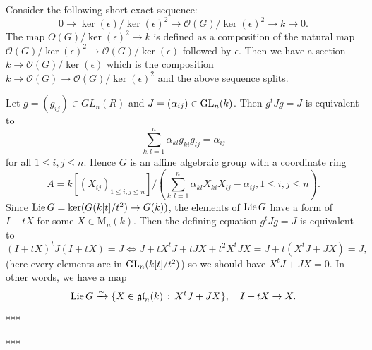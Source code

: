 \begin{problem}
Consider the following short exact sequence:
$$
    0 \to \ker(\epsilon) / \ker(\epsilon)^{2} \to \mathcal{O}(G) / \ker(\epsilon)^{2} \to k \to 0.
$$
The map $O(G) / \ker(\epsilon)^{2} \to k$ is defined as a composition of the natural map $\mathcal{O}(G)/\ker(\epsilon)^{2} \to \mathcal{O}(G)/\ker(\epsilon)$
followed by $\epsilon$.
Then we have a section $k \to \mathcal{O}(G)/\ker(\epsilon)$ which is the composition $k \to \mathcal{O}(G) \to \mathcal{O}(G)/\ker(\epsilon)^{2}$ and the above sequence splits.
\end{problem}

\begin{problem}
Let $g = (g_{ij}) \in GL_{n}(R)$ and $J = (\alpha_{ij}) \in \operatorname{\mathrm{GL}}_{n}(k)$.
Then $g^{t}Jg = J$ is equivalent to
$$
    \sum_{k, l = 1}^{n} \alpha_{kl}g_{ki}g_{lj} = \alpha_{ij}
$$
for all $1\leq i, j \leq n$.
Hence $G$ is an affine algebraic group with a coordinate ring
$$
A = k[(X_{ij})_{1\leq i, j \leq n}]/\left(\sum_{k, l =1}^{n} \alpha_{kl}X_{ki}X_{lj} - \alpha_{ij}, 1\leq i, j \leq n\right).
$$
Since $\operatorname{\mathrm{Lie}} G = \ker(G(k[t]/t^{2}) \to G(k))$, the elements of $\operatorname{\mathrm{Lie}} G$ have a form of $I + tX$ for some $X\in \mathrm{M}_{n}(k)$.
Then the defining equation $g^{t}Jg = J$ is equivalent to
$$
    (I + tX)^{t}J(I + tX) = J \Leftrightarrow J + tX^{t}J + tJX + t^{2}X^{t}JX = J + t(X^{t}J + JX) = J,
$$
(here every elements are in $\operatorname{\mathrm{GL}}_{n}(k[t]/t^{2})$) so we should have $X^{t}J + JX = 0$.
In other words, we have a map
$$
\operatorname{\mathrm{Lie}} G \xrightarrow{\sim} \{X \in \mathfrak{gl}_{n}(k)\,:\, X^{t}J + JX\}, \quad I + tX \to X.
$$
\end{problem}

\begin{problem} ***
\end{problem}

\begin{problem} ***
\end{problem}

